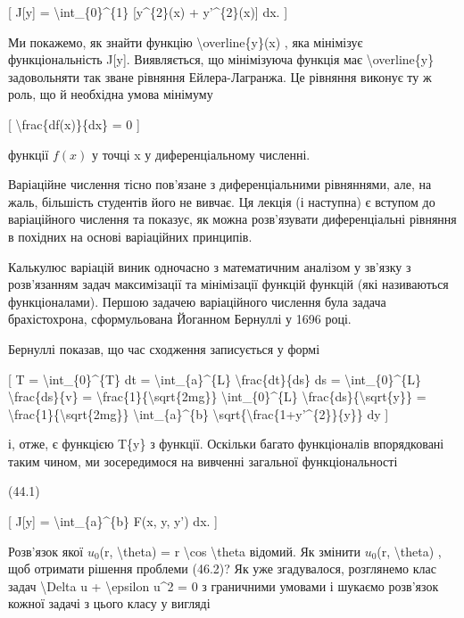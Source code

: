 \documentclass[
]{article}
\begin{document}
{[} J{[}y{]} = \textbackslash int\_\{0\}\^{}\{1\} {[}y\^{}\{2\}(x) +
y'\^{}\{2\}(x){]} dx. {]}

Ми покажемо, як знайти функцію \textbackslash overline\{y\}(x) , яка
мінімізує функціональність J{[}y{]}. Виявляється, що мінімізуюча функція
має \textbackslash overline\{y\} задовольняти так зване рівняння
Ейлера-Лагранжа. Це рівняння виконує ту ж роль, що й необхідна умова
мінімуму

{[} \textbackslash frac\{df(x)\}\{dx\} = 0 {]}

функції \(f(x)\) у точці x у диференціальному численні.

Варіаційне числення тісно пов'язане з диференціальними рівняннями, але,
на жаль, більшість студентів його не вивчає. Ця лекція (і наступна) є
вступом до варіаційного числення та показує, як можна розв'язувати
диференціальні рівняння в похідних на основі варіаційних принципів.

Калькулюс варіацій виник одночасно з математичним аналізом у зв'язку з
розв'язанням задач максимізації та мінімізації функцій функцій (які
називаються функціоналами). Першою задачею варіаційного числення була
задача брахістохрона, сформульована Йоганном Бернуллі у 1696 році.

Бернуллі показав, що час сходження записується у формі

{[} T = \textbackslash int\_\{0\}\^{}\{T\} dt =
\textbackslash int\_\{a\}\^{}\{L\} \textbackslash frac\{dt\}\{ds\} ds =
\textbackslash int\_\{0\}\^{}\{L\} \textbackslash frac\{ds\}\{v\} =
\textbackslash frac\{1\}\{\textbackslash sqrt\{2mg\}\}
\textbackslash int\_\{0\}\^{}\{L\}
\textbackslash frac\{ds\}\{\textbackslash sqrt\{y\}\} =
\textbackslash frac\{1\}\{\textbackslash sqrt\{2mg\}\}
\textbackslash int\_\{a\}\^{}\{b\}
\textbackslash sqrt\{\textbackslash frac\{1+y'\^{}\{2\}\}\{y\}\} dy {]}

і, отже, є функцією T\{y\} з функції. Оскільки багато функціоналів
впорядковані таким чином, ми зосередимося на вивченні загальної
функціональності

(44.1)

{[} J{[}y{]} = \textbackslash int\_\{a\}\^{}\{b\} F(x, y, y') dx. {]}

Розв'язок якої \(u_0\)(r, \textbackslash theta) = r \textbackslash cos
\textbackslash theta відомий. Як змінити \(u_0\)(r,
\textbackslash theta) , щоб отримати рішення проблеми (46.2)? Як уже
згадувалося, розглянемо клас задач \textbackslash Delta u +
\textbackslash epsilon u\^{}2 = 0 з граничними умовами і шукаємо
розв'язок кожної задачі з цього класу у вигляді
\end{document}
